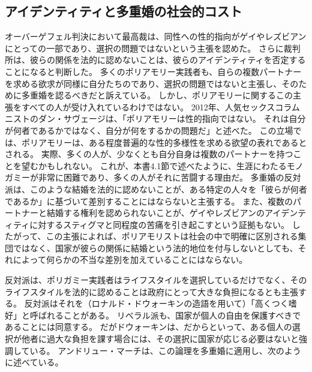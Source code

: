 \documentclass[paper=a4,book,openany]{jlreq}
\newcommand{\ig}[1]{}           %
\begin{document}
\subsection{アイデンティティと多重婚の社会的コスト}

オーバーゲフェル判決において最高裁は、同性への性的指向がゲイやレズビアンにとっての一部であり、選択の問題ではないという主張を認めた。
さらに裁判所は、彼らの関係を法的に認めないことは、彼らのアイデンティティを否定することになると判断した。
多くのポリアモリー実践者も、自らの複数パートナーを求める欲求が同様に自分たちのであり、選択の問題ではないと主張し、そのために多重婚を認るべきだと訴えている。
しかし、ポリアモリーに関するこの主張をすべての人が受け入れているわけではない。
2012年、人気セックスコラムニストのダン・サヴェージは、「ポリアモリーは性的指向ではない。
それは自分が何者であるかではなく、自分が何をするかの問題だ」と述べた\citep{savage12:_savag_busted}。
この立場では、ポリアモリーは、ある程度普遍的な性的多様性を求める欲望の表れであるとされる。
実際、多くの人が、少なくとも自分自身は複数のパートナーを持つことを望むかもしれない。
これが、本書4.1節で述べたように、生涯にわたるモノガミーが非常に困難であり、多くの人がそれに苦闘する理由だ。
多重婚の反対派は、このような結婚を法的に認めないことが、ある特定の人々を「彼らが何者であるか」に基づいて差別することにはならないと主張する。
また、複数のパートナーと結婚する権利を認められないことが、ゲイやレズビアンのアイデンティティに対するスティグマと同程度の苦痛を引き起こすという証拠もない。
したがって、この主張によれば、ポリアモリストは社会の中で明確に区別される集団ではなく、国家が彼らの関係に結婚という法的地位を付与しないとしても、それによって何らかの不当な差別を加えていることにはならない。

反対派は、ポリガミー実践者はライフスタイルを選択しているだけでなく、そのライフスタイルを法的に認めることは政府にとって大きな負担になるとも主張する。
反対派はそれを（ロナルド・ドウォーキン\ig{Ronald Dworkin}の造語を用いて）「高くつく嗜好」と呼ばれることがある。
リベラル派も、国家が個人の自由を保護すべきであることには同意する。
だがドウォーキンは、だからといって、ある個人の選択が他者に過大な負担を課す場合には、その選択に国家が応じる必要はないと強調している\citep[p.229]{dworkin81:_what_is_equal}。
アンドリュー・マーチは、この論理を多重婚に適用し、次のように述べている。
\end{document}
